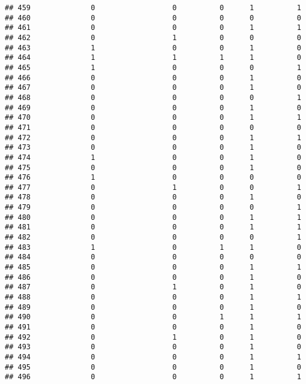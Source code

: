 \documentclass[
]{article}
\begin{document}
\begin{verbatim}
## 459              0                  0          0      1          1
## 460              0                  0          0      0          0
## 461              0                  0          0      1          1
## 462              0                  1          0      0          0
## 463              1                  0          0      1          0
## 464              1                  1          1      1          0
## 465              1                  0          0      0          1
## 466              0                  0          0      1          0
## 467              0                  0          0      1          0
## 468              0                  0          0      0          1
## 469              0                  0          0      1          0
## 470              0                  0          0      1          1
## 471              0                  0          0      0          0
## 472              0                  0          0      1          1
## 473              0                  0          0      1          0
## 474              1                  0          0      1          0
## 475              0                  0          0      1          0
## 476              1                  0          0      0          0
## 477              0                  1          0      0          1
## 478              0                  0          0      1          0
## 479              0                  0          0      0          1
## 480              0                  0          0      1          1
## 481              0                  0          0      1          1
## 482              0                  0          0      0          1
## 483              1                  0          1      1          0
## 484              0                  0          0      0          0
## 485              0                  0          0      1          1
## 486              0                  0          0      1          0
## 487              0                  1          0      1          0
## 488              0                  0          0      1          1
## 489              0                  0          0      1          0
## 490              0                  0          1      1          1
## 491              0                  0          0      1          0
## 492              0                  1          0      1          0
## 493              0                  0          0      1          0
## 494              0                  0          0      1          1
## 495              0                  0          0      1          0
## 496              0                  0          0      1          1

\end{verbatim}
\end{document}
